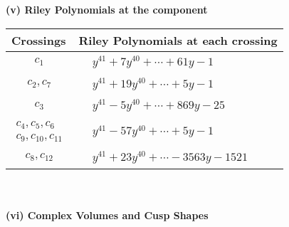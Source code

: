 \documentclass[1p]{elsarticle_modified}
\theoremstyle{definition}
\begin{document}
\newpage\renewcommand{\arraystretch}{1}
\flushleft \textbf{(v) Riley Polynomials at the component}\newline \\
\begin{tabular}{m{50pt}|m{274pt}}
Crossings & \hspace{64pt}Riley Polynomials at each crossing \\
\hline $$\begin{aligned}c_{1}\end{aligned}$$&$\begin{aligned}
&y^{41}+7 y^{40}+\cdots+61 y-1
\end{aligned}$\\
\hline $$\begin{aligned}c_{2},c_{7}\end{aligned}$$&$\begin{aligned}
&y^{41}+19 y^{40}+\cdots+5 y-1
\end{aligned}$\\
\hline $$\begin{aligned}c_{3}\end{aligned}$$&$\begin{aligned}
&y^{41}-5 y^{40}+\cdots+869 y-25
\end{aligned}$\\
\hline $$\begin{aligned}c_{4},c_{5},c_{6}\\c_{9},c_{10},c_{11}\end{aligned}$$&$\begin{aligned}
&y^{41}-57 y^{40}+\cdots+5 y-1
\end{aligned}$\\
\hline $$\begin{aligned}c_{8},c_{12}\end{aligned}$$&$\begin{aligned}
&y^{41}+23 y^{40}+\cdots-3563 y-1521
\end{aligned}$\\
\hline
\end{tabular}\\~\\
\newpage\flushleft \textbf{(vi) Complex Volumes and Cusp Shapes}
\end{document}
